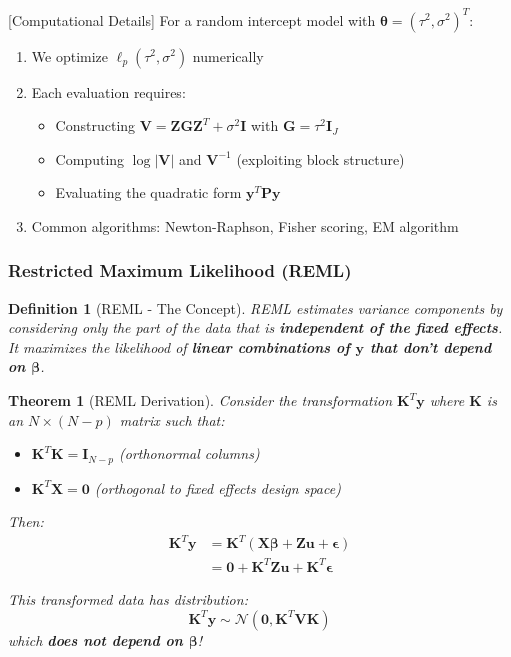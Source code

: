 \documentclass{article}
\newtheorem{definition}{Definition}
\newtheorem{theorem}{Theorem}
\begin{document}
[Computational Details]
For a random intercept model with $\boldsymbol{\theta} = (\tau^2, \sigma^2)^T$:
\begin{enumerate}
    \item We optimize $\ell_p(\tau^2, \sigma^2)$ numerically
    \item Each evaluation requires:
    \begin{itemize}
        \item Constructing $\mathbf{V} = \mathbf{ZGZ}^T + \sigma^2\mathbf{I}$ with $\mathbf{G} = \tau^2\mathbf{I}_J$
        \item Computing $\log|\mathbf{V}|$ and $\mathbf{V}^{-1}$ (exploiting block structure)
        \item Evaluating the quadratic form $\mathbf{y}^T\mathbf{P}\mathbf{y}$
    \end{itemize}
    \item Common algorithms: Newton-Raphson, Fisher scoring, EM algorithm
\end{enumerate}


\subsubsection{Restricted Maximum Likelihood (REML)}

\begin{definition}[REML - The Concept]
REML estimates variance components by considering only the part of the data that is \textbf{independent of the fixed effects}. It maximizes the likelihood of \textbf{linear combinations of $\mathbf{y}$ that don't depend on $\boldsymbol{\beta}$}.
\end{definition}

\begin{theorem}[REML Derivation]
Consider the transformation $\mathbf{K}^T\mathbf{y}$ where $\mathbf{K}$ is an $N \times (N-p)$ matrix such that:
\begin{itemize}
    \item $\mathbf{K}^T\mathbf{K} = \mathbf{I}_{N-p}$ (orthonormal columns)
    \item $\mathbf{K}^T\mathbf{X} = \mathbf{0}$ (orthogonal to fixed effects design space)
\end{itemize}

Then:
\begin{align}
\mathbf{K}^T\mathbf{y} &= \mathbf{K}^T(\mathbf{X}\boldsymbol{\beta} + \mathbf{Z}\mathbf{u} + \boldsymbol{\epsilon}) \\
&= \mathbf{0} + \mathbf{K}^T\mathbf{Z}\mathbf{u} + \mathbf{K}^T\boldsymbol{\epsilon}
\end{align}

This transformed data has distribution:
\begin{equation}
\mathbf{K}^T\mathbf{y} \sim \mathcal{N}(\mathbf{0}, \mathbf{K}^T\mathbf{V}\mathbf{K})
\end{equation}
which \textbf{does not depend on $\boldsymbol{\beta}$}!
\end{theorem}
\end{document}
